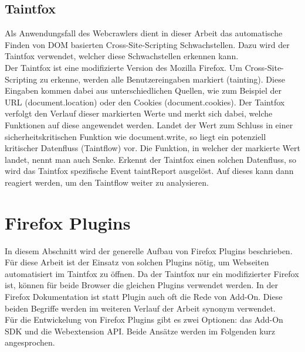 \subsection{Taintfox}
Als Anwendungsfall des Webcrawlers dient in dieser Arbeit das automatische Finden von DOM basierten Cross-Site-Scripting Schwachstellen. Dazu wird der Taintfox verwendet, welcher diese Schwachstellen erkennen kann. \\
Der Taintfox ist eine modifizierte Version des Mozilla Firefox. Um Cross-Site-Scripting zu erkenne, werden alle Benutzereingaben markiert (tainting). Diese Eingaben kommen dabei aus unterschiedlichen Quellen, wie zum Beispiel der URL (document.location) oder den Cookies (document.cookies). Der Taintfox verfolgt den Verlauf dieser markierten Werte und merkt sich dabei, welche Funktionen auf diese angewendet werden. Landet der Wert zum Schluss in einer sicherheitskritischen Funktion wie document.write, so liegt ein potenziell kritischer Datenfluss (Taintflow) vor. Die Funktion, in welcher der markierte Wert landet, nennt man auch Senke. Erkennt der Taintfox einen solchen Datenfluss, so wird das Taintfox spezifische Event taintReport ausgelöst. Auf dieses kann dann reagiert werden, um den Taintflow weiter zu analysieren. \cite{Taintfox}


\section{Firefox Plugins}
\label{sec:FirefoxPlugins}
In diesem Abschnitt wird der generelle Aufbau von Firefox Plugins beschrieben. Für diese Arbeit ist der Einsatz von solchen Plugins nötig, um Webseiten automatisiert im Taintfox zu öffnen. Da der Taintfox nur ein modifizierter Firefox ist, können für beide Browser die gleichen Plugins verwendet werden. In der Firefox Dokumentation ist statt Plugin auch oft die Rede von Add-On. Diese beiden Begriffe werden im weiteren Verlauf der Arbeit synonym verwendet. \\
Für die Entwickelung von Firefox Plugins gibt es zwei Optionen: das Add-On SDK und die Webextension API. Beide Ansätze werden im Folgenden kurz angesprochen.
